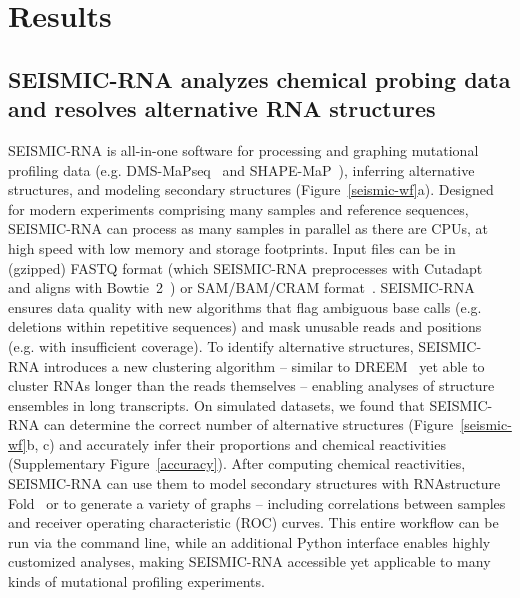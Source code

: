 \documentclass[main.tex]{subfiles}
\begin{document}
\section{Results}

\subsection{SEISMIC-RNA analyzes chemical probing data and resolves alternative RNA structures}


SEISMIC-RNA is all-in-one software for processing and graphing mutational profiling data (e.g. DMS-MaPseq~\cite{Zubradt2016} and SHAPE-MaP~\cite{Siegfried2014}), inferring alternative structures, and modeling secondary structures (Figure~\ref{seismic-wf}a).
Designed for modern experiments comprising many samples and reference sequences, SEISMIC-RNA can process as many samples in parallel as there are CPUs, at high speed with low memory and storage footprints.
Input files can be in (gzipped) FASTQ format (which SEISMIC-RNA preprocesses with Cutadapt~\cite{Martin2011} and aligns with Bowtie~2~\cite{Langmead2012}) or SAM/BAM/CRAM format~\cite{Li2009}.
SEISMIC-RNA ensures data quality with new algorithms that flag ambiguous base calls (e.g. deletions within repetitive sequences) and mask unusable reads and positions (e.g. with insufficient coverage).
To identify alternative structures, SEISMIC-RNA introduces a new clustering algorithm -- similar to DREEM~\cite{Tomezsko2020} yet able to cluster RNAs longer than the reads themselves -- enabling analyses of structure ensembles in long transcripts.
On simulated datasets, we found that SEISMIC-RNA can determine the correct number of alternative structures (Figure~\ref{seismic-wf}b, c) and accurately infer their proportions and chemical reactivities (Supplementary Figure~\ref{accuracy}).
After computing chemical reactivities, SEISMIC-RNA can use them to model secondary structures with RNAstructure Fold~\cite{Reuter2010,Cordero2012} or to generate a variety of graphs -- including correlations between samples and receiver operating characteristic (ROC) curves.
This entire workflow can be run via the command line, while an additional Python interface enables highly customized analyses, making SEISMIC-RNA accessible yet applicable to many kinds of mutational profiling experiments.
\end{document}

